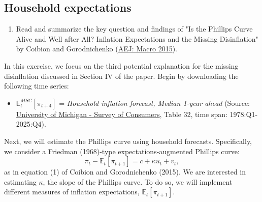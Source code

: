 \documentclass[dvipsnames,11pt]{article}
\begin{document}
    \subsection{Household expectations}
    
        \begin{enumerate}[resume]
            \item Read and summarize the key question and findings of "Is the Phillips Curve Alive and Well after All? Inflation Expectations and the Missing Disinflation" by Coibion and Gorodnichenko (\href{https://www.aeaweb.org/articles?id=10.1257/mac.20130306}{AEJ: Macro 2015}). 
        \end{enumerate}

        \noindent In this exercise, we focus on the third potential explanation for the missing disinflation discussed in Section IV of the paper. Begin by downloading the following time series: 
        \begin{itemize}
            \item[\(\Rightarrow\)] $\mathbb{E}^{MSC}_t[\pi_{t+4}]$ = \textit{Household inflation forecast, Median 1-year ahead} (Source: \href{https://data.sca.isr.umich.edu/data-archive/mine.php}{University of Michigan - Survey of Consumers}, Table 32, time span: 1978:Q1-2025:Q4).
        \end{itemize}

        \noindent Next, we will estimate the Phillips curve using household forecasts. Specifically, we consider a Friedman (1968)-type expectations-augmented Phillips curve:
        \begin{equation}\label{eq1} 
            \pi_t - \mathbb{E}_t[\pi_{t+1}] = c  + \kappa u_t + v_t,
        \end{equation}
        as in equation (1) of Coibion and Gorodnichenko (2015). We are interested in estimating $\kappa$, the slope of the Phillips curve. To do so, we will implement different measures of inflation expectations, $\mathbb{E}_t[\pi_{t+1}]$.
        
\end{document}
